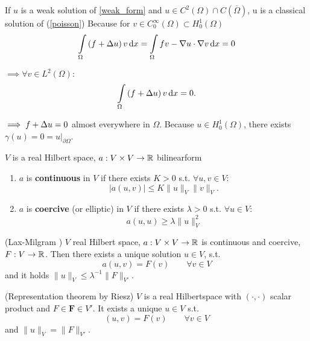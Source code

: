 If $u$ is a weak solution of \eqref{weak_form} and $u \in C^2(\Omega)\cap C(\overline{\Omega})$, u is a classical solution of (\ref{poisson}) Because for $v \in C^\infty_0(\Omega) \subset H^1_0(\Omega)$
\begin{equation*}
	\int \limits_\Omega \left( f + \Delta u \right) v \mathop{}\!\mathrm{d} x = \int \limits_\Omega  fv - \nabla u \cdot \nabla v \mathop{}\!\mathrm{d} x = 0
\end{equation*}

$\implies \forall v\in L^2(\Omega):$ 
\begin{equation*}
	\int \limits_\Omega \left( f + \Delta u \right) v \mathop{}\!\mathrm{d} x = 0.
\end{equation*}

$\implies f + \Delta u = 0$ almost everywhere in $\Omega$.\enter
Because $u \in H^1_0(\Omega)$, there exists $\gamma(u) = 0 = u|_{\partial \Omega}$.

\begin{definition_}
	$V$ is a real Hilbert space, $a: V \times V \to \mathbb{R}$ bilinearform
	\begin{enumerate}[label=(\alph*)]
		\item $a$ is \textbf{continuous} in $V$ if there exists $K > 0$ s.t. $\forall u,v \in V:$ 
		\begin{equation*}
			|a(u,v)| \leq K \|u\|_V \|v\|_V.
		\end{equation*} 
		\item $a$ is \textbf{coercive} (or elliptic) in $V$ if there exists $\lambda > 0$ s.t. $\forall u \in V:$
		\begin{equation*}
			a(u,u)  \geq \lambda \|u\|^2_V
		\end{equation*}
	\end{enumerate}
\end{definition_}

\begin{thrm}
	(Lax-Milgram )\enter
	$V$ real Hilbert space, $a: V \times V \to \mathbb{R}$ is continuous and coercive, $F:V \to \mathbb{R}$. Then there exists a unique solution $u \in V$, s.t.
	\begin{equation*}
		a(u,v) = F(v) \qquad \forall v \in V
	\end{equation*}
	and it holds $\|u\|_V \leq \lambda^{-1}\|F\|_{V'}$.
\end{thrm}

\begin{reminder}
	(Representation theorem by Riesz)\enter
	$V$ is a real Hilbertspace with $(\cdot,\cdot)$ scalar product and $F \in \textbf{F} \in V'$. It exists a unique $u \in V$ s.t.
	\begin{equation*}
		(u,v) = F(v) \qquad \forall v\in V
	\end{equation*} 
	and $\|u\|_V = \|F\|_{V'}$.
\end{reminder}

